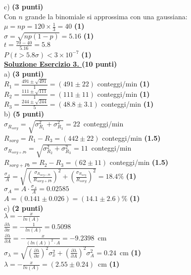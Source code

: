 \documentclass[10pt,a4paper,fleqn]{article}
\begin{document}
c) {\bf (3 punti)} \\ 
Con $n$ grande la binomiale si approssima con una gaussiana:\\
$\mu=np=120\times\frac{1}{3}=40$ {\bf (1)}\\
$\sigma=\sqrt{np(1-p)}=5.16$ {\bf (1)}\\
$t=\frac{70-40}{5.16}=5.8$ \\
$P(t>5.8\sigma)<3\times 10^{-7}$ {\bf (1)}\\

\vskip0.30cm {\bf \underline {Soluzione Esercizio 3. } } {\bf (10 punti)}\\

a) {\bf (3 punti)} \\
$R_1=\frac{491\pm\sqrt{491}}{1}=(491 \pm 22)$ conteggi/min {\bf (1)}\\
$R_2=\frac{111\pm\sqrt{111}}{1}=(111 \pm 11)$ conteggi/min {\bf (1)}\\
$R_3=\frac{244\pm\sqrt{244}}{5}=(48.8 \pm 3.1)$ conteggi/min {\bf(1)}\\

b) {\bf (5 punti)} \\
$\sigma_{R_{sorg}}=\sqrt{\sigma^2_{R_{1}}+\sigma^2_{R_{3}}}=22$~conteggi/min \\
$R_{sorg}=R_1-R_3=(442\pm 22)$ conteggi/min {\bf (1.5)}\\
$\sigma_{R_{sorg+Pb}}=\sqrt{\sigma^2_{R_{2}}+\sigma^2_{R_{3}}}=11$~conteggi/min \\
$R_{sorg+Pb}=R_2-R_3=(62\pm 11)$ conteggi/min {\bf (1.5)}\\
$\frac{\sigma_A}{A}=\sqrt{ {(\frac{\sigma_{R_{sorg+Pb}}} {R_{sorg+Pb}})}^2
  +{(\frac{\sigma_{R_{sorg}}} {R_{sorg}})}^2  }=18.4\%$ {\bf (1)}\\
$\sigma_A=A \cdot \frac{\sigma_A}{A} = 0.02585$\\
$A=(0.141 \pm 0.026)=(14.1 \pm 2.6) \% $ {\bf (1)}\\

c) {\bf (2 punti)} \\
$\lambda = -\frac{x}{ln(A)}$\\
$\frac{\partial \lambda}{\partial x}=-\frac{1}{ln(A)}=0.5098$\\
$\frac{\partial \lambda}{\partial A}=-\frac{x}{(ln(A))^2 \cdot
  A}=-9.2398$~cm \\
$\sigma_{\lambda}=\sqrt{ (\frac{\partial \lambda}{\partial
    x})^2\sigma_x^2 + (\frac{\partial \lambda}{\partial A})^2
  \sigma_A^2  }=0.24$~cm {\bf (1)}\\
$\lambda=-\frac{x}{ln(A)}=(2.55 \pm 0.24)$~cm {\bf (1)}
\end{document}
